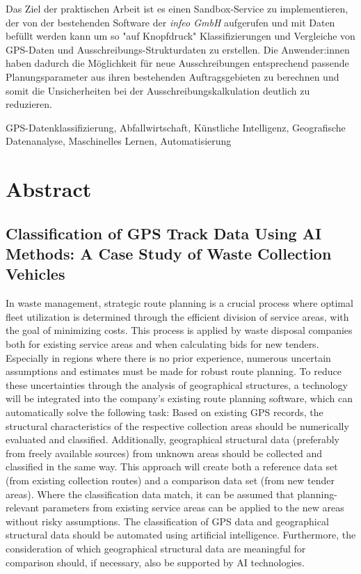 \documentclass[a4paper,12pt,twoside]{scrreprt}
\begin{document}
Das Ziel der praktischen Arbeit ist es einen Sandbox-Service zu implementieren,
der von der bestehenden Software der \textit{infeo GmbH} aufgerufen und mit
Daten befüllt
werden kann um so "auf Knopfdruck" Klassifizierungen und Vergleiche von
GPS-Daten und Ausschreibungs-Strukturdaten zu erstellen. Die Anwender:innen
haben dadurch die Möglichkeit für neue Ausschreibungen entsprechend passende
Planungsparameter aus ihren bestehenden Auftragsgebieten zu berechnen und somit
die Unsicherheiten bei der Ausschreibungskalkulation deutlich zu reduzieren.

\vspace{0.5cm}

\noindent
GPS-Datenklassifizierung, Abfallwirtschaft, Künstliche Intelligenz,
Geografische Datenanalyse, Maschinelles Lernen, Automatisierung

\newpage
\section*{Abstract}
\subsection*{Classification of GPS Track Data Using AI Methods: A Case Study of
  Waste Collection Vehicles}

In waste management, strategic route planning is a crucial process where
optimal fleet utilization is determined through the efficient division of
service areas, with the goal of minimizing costs. This process is applied by
waste disposal companies both for existing service areas and when calculating
bids for new tenders. Especially in regions where there is no prior experience,
numerous uncertain assumptions and estimates must be made for robust route
planning. To reduce these uncertainties through the analysis of geographical
structures, a technology will be integrated into the company’s existing route
planning software, which can automatically solve the following task: Based on
existing GPS records, the structural characteristics of the respective
collection areas should be numerically evaluated and classified. Additionally,
geographical structural data (preferably from freely available sources) from
unknown areas should be collected and classified in the same way. This approach
will create both a reference data set (from existing collection routes) and a
comparison data set (from new tender areas). Where the classification data
match, it can be assumed that planning-relevant parameters from existing
service areas can be applied to the new areas without risky assumptions. The
classification of GPS data and geographical structural data should be automated
using artificial intelligence. Furthermore, the consideration of which
geographical structural data are meaningful for comparison should, if
necessary, also be supported by AI technologies.
\end{document}
